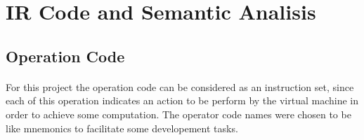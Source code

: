 \newpage

\section{IR Code and Semantic Analisis}
\subsection{Operation Code}
\paragraph{} For this project the operation code can be considered as an
instruction set, since each of this operation indicates an action to be perform
by the virtual machine in order to achieve some computation. The operator code
names were chosen to be like mnemonics to facilitate some developement tasks.

